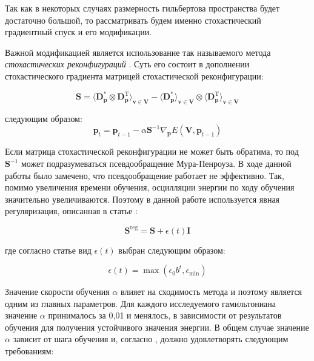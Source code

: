 Так как в некоторых случаях размерность гильбертова пространства будет достаточно большой, то рассматривать будем именно стохастический градиентный спуск и его модификации.

Важной модификацией является использование так называемого метода \textit{стохастических реконфигураций} \cite{sorella2007weak}. 
Суть его состоит в дополнении стохастического градиента матрицей стохастической реконфигурации:

\begin{equation}
\mathbf{S}=\langle \mathbf{D}^*_{\mathbf{p}} \otimes \mathbf{D}_{\mathbf{p}}^{\text{T}}\rangle_{\mathbf{v}\in \mathbf{V}}-
\langle \mathbf{D}^*_{\mathbf{p}} \rangle_{\mathbf{v}\in \mathbf{V}} \otimes \langle \mathbf{D}_{\mathbf{p}}^{\text{T}}\rangle_{\mathbf{v}\in \mathbf{V}}
\end{equation}

\noindent следующим образом:
\begin{equation}
\mathbf{p}_t =\mathbf{p}_{t-1} - \alpha\mathbf{S}^{-1}\nabla_{\mathbf{p}} E(\mathbf{V}, \mathbf{p}_{t-1})
\end{equation}

Если матрица стохастической реконфигурации не может быть обратима, то под $\mathbf{S}^{-1}$ может подразумеваться псевдообращение Мура-Пенроуза.
В ходе данной работы было замечено, что псевдообращение работает не эффективно.
Так, помимо увеличения времени обучения, осцилляции энергии по ходу обучения значительно увеличиваются.
Поэтому в данной работе используется явная регуляризация, описанная в статье \cite{sorella2007weak}:

\begin{equation}
\mathbf{S}^{\text{reg}} =\mathbf{S} + \epsilon(t)\mathbf{I}
\end{equation}

\noindent где согласно статье \cite{carleo2017solving} вид $\epsilon(t)$ выбран следующим образом:

\begin{equation}
\epsilon(t) = \max(\epsilon_0 b^t, \epsilon_{\text{min}})
\end{equation}

Значение скорости обучения $\alpha$ влияет на сходимость метода и поэтому является одним из главных параметров.
Для каждого исследуемого гамильтониана значение $\alpha$ принималось за 0,01 и менялось, в зависимости от результатов обучения для получения устойчивого значения энергии.
В общем случае значение  $\alpha$ зависит от шага обучения и, согласно \cite{harju1997stochastic}, должно удовлетворять следующим требованиям:

